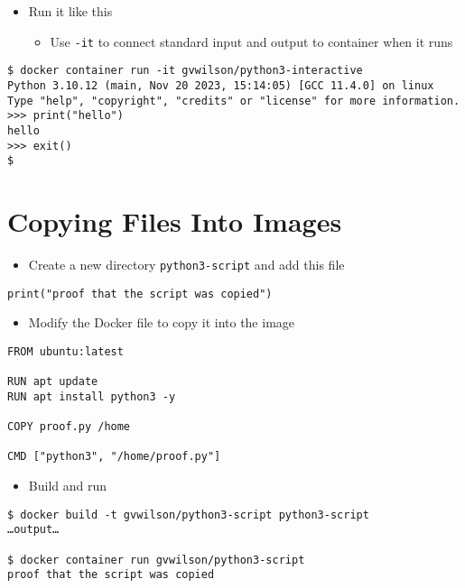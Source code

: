\documentclass[krantzl]{krantz}
\begin{document}
\begin{itemize}
\item Run it like this\begin{itemize}
\item Use \texttt{-it} to connect standard input and output to container when it runs

\end{itemize}


\end{itemize}
\begin{lstlisting}[frame=tblr,backgroundcolor=\color{black!5}]
$ docker container run -it gvwilson/python3-interactive
Python 3.10.12 (main, Nov 20 2023, 15:14:05) [GCC 11.4.0] on linux
Type "help", "copyright", "credits" or "license" for more information.
>>> print("hello")
hello
>>> exit()
$
\end{lstlisting}

\section{Copying Files Into Images}
\begin{itemize}
\item Create a new directory \texttt{python3-script} and add this file

\end{itemize}
\begin{lstlisting}[frame=tblr]
print("proof that the script was copied")
\end{lstlisting}

\begin{itemize}
\item Modify the Docker file to copy it into the image

\end{itemize}
\begin{lstlisting}[frame=tblr]
FROM ubuntu:latest

RUN apt update
RUN apt install python3 -y

COPY proof.py /home

CMD ["python3", "/home/proof.py"]
\end{lstlisting}

\begin{itemize}
\item Build and run

\end{itemize}
\begin{lstlisting}[frame=tblr,backgroundcolor=\color{black!5}]
$ docker build -t gvwilson/python3-script python3-script
…output…

$ docker container run gvwilson/python3-script
proof that the script was copied
\end{lstlisting}
\end{document}
